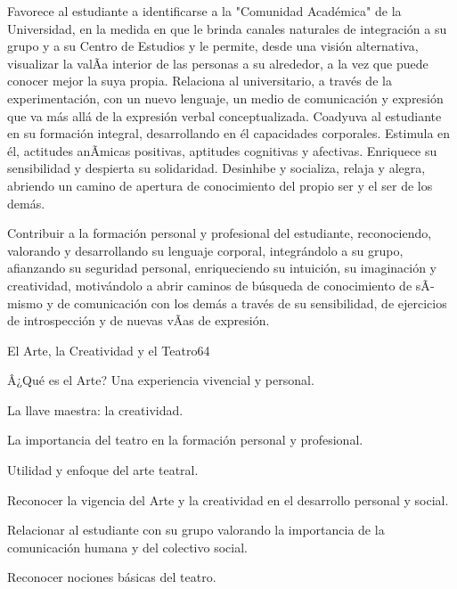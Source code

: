 \begin{syllabus}


\begin{justification}
Favorece al estudiante a identificarse a la "Comunidad Académica" de la Universidad, en la medida en que le brinda canales naturales de integración a su grupo y  a su Centro de Estudios y le permite,  desde una visión alternativa, visualizar la valÃ­a interior de las personas a su alrededor, a la vez que puede conocer mejor la suya propia. 
Relaciona al universitario, a través de la experimentación, con un nuevo lenguaje, un medio de comunicación y expresión que va más allá de la expresión verbal conceptualizada.
Coadyuva al estudiante en su formación integral, desarrollando en él  capacidades corporales. Estimula en él, actitudes anÃ­micas positivas,  aptitudes cognitivas y afectivas. Enriquece su sensibilidad y despierta su solidaridad.    
Desinhibe y socializa, relaja y alegra,  abriendo un camino de apertura de conocimiento del propio ser y el ser de los demás.

\end{justification}

\begin{goals}
\item Contribuir a la formación personal y profesional del estudiante, reconociendo, valorando y desarrollando su lenguaje corporal, integrándolo a su grupo, afianzando su seguridad personal, enriqueciendo su intuición, su imaginación y creatividad, motivándolo  a abrir caminos de búsqueda  de conocimiento de sÃ­ mismo y de comunicación con los demás a través de su sensibilidad, de ejercicios de introspección y de nuevas vÃ­as de expresión.   
\end{goals}

\begin{outcomes}
\end{outcomes}

\begin{unit}{El Arte, la Creatividad y el Teatro}{}{6}{4}
\begin{topics}
	\item Â¿Qué es el Arte? Una experiencia vivencial y personal.
	\item La llave maestra: la creatividad.
	\item La importancia del teatro en la formación personal y profesional.
	\item Utilidad y enfoque del arte teatral.
\end{topics}
\begin{unitgoals}
	\item Reconocer la vigencia del Arte y la creatividad en el desarrollo personal y social.
	\item Relacionar al estudiante con su grupo valorando la importancia de la comunicación humana y del colectivo  social.
	\item Reconocer nociones  básicas del teatro. 
\end{unitgoals}
\end{unit}


\end{syllabus}
